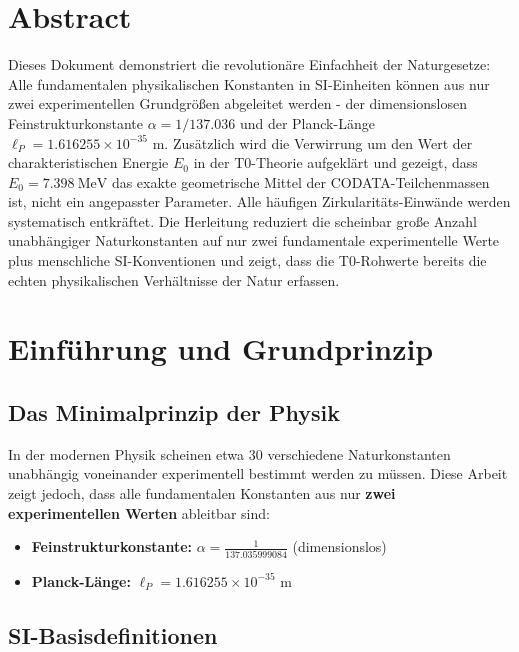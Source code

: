 \section*{Abstract}
		Dieses Dokument demonstriert die revolutionäre Einfachheit der Naturgesetze: Alle fundamentalen physikalischen Konstanten in SI-Einheiten können aus nur zwei experimentellen Grundgröß{}en abgeleitet werden - der dimensionslosen Feinstrukturkonstante $\alpha = 1/137.036$ und der Planck-Länge $\ell_P = 1.616255 \times 10^{-35}$ m. Zusätzlich wird die Verwirrung um den Wert der charakteristischen Energie $E_0$ in der T0-Theorie aufgeklärt und gezeigt, dass $E_0 = \SI{7.398}{\MeV}$ das exakte geometrische Mittel der CODATA-Teilchenmassen ist, nicht ein angepasster Parameter. Alle häufigen Zirkularitäts-Einwände werden systematisch entkräftet. Die Herleitung reduziert die scheinbar groß{}e Anzahl unabhängiger Naturkonstanten auf nur zwei fundamentale experimentelle Werte plus menschliche SI-Konventionen und zeigt, dass die T0-Rohwerte bereits die echten physikalischen Verhältnisse der Natur erfassen.

	
	
	\section{Einführung und Grundprinzip}
	
	\subsection{Das Minimalprinzip der Physik}
	
	In der modernen Physik scheinen etwa 30 verschiedene Naturkonstanten unabhängig voneinander experimentell bestimmt werden zu müssen. Diese Arbeit zeigt jedoch, dass alle fundamentalen Konstanten aus nur \textbf{zwei experimentellen Werten} ableitbar sind:
	
	\begin{tcolorbox}[colback=blue!5!white,colframe=blue!75!black,title=Fundamentale Eingangsdaten]
		\begin{itemize}
			\item \textbf{Feinstrukturkonstante:} $\alpha = \frac{1}{137.035999084}$ (dimensionslos)
			\item \textbf{Planck-Länge:} $\ell_P = 1.616255 \times 10^{-35}$ \si{\meter}
		\end{itemize}
	\end{tcolorbox}
	
	\subsection{SI-Basisdefinitionen}
	
